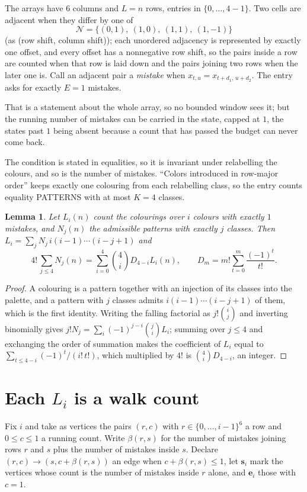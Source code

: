 \documentclass[11pt,a4paper]{article}
\theoremstyle{plain}
\newtheorem{lemma}[theorem]{Lemma}
\theoremstyle{definition}
\begin{document}
The arrays have $6$ columns and $L=n$ rows, entries in $\{0,\dots,4-1\}$.
Two cells are adjacent when they differ by one of
\[
\mathcal N=\{(0,1),\ (1,0),\ (1,1),\ (1,-1)\}
\]
(as (row shift, column shift)); each unordered adjacency is represented by exactly one
offset, and every offset has a nonnegative row shift, so the pairs inside a row are
counted when that row is laid down and the pairs joining two rows when the later one
is. Call an adjacent pair a \emph{mistake} when $x_{t,u}=x_{t+d_1,\,u+d_2}$. The entry asks for exactly
$E=1$ mistakes.

That is a statement about the whole array, so no bounded window sees it; but the running
number of mistakes can be carried in the state, capped at $1$, the states past $1$ being
absent because a count that has passed the budget can never come back.

The condition is stated in equalities, so it is invariant under relabelling the colours, and
so is the number of mistakes. ``Colors introduced in row-major order'' keeps exactly one
colouring from each relabelling class, so the entry counts equality PATTERNS with at most
$K=4$ classes.

\begin{lemma}\label{lem:inv}
Let $L_i(n)$ count the colourings over $i$ colours with exactly $1$ mistakes, and $N_j(n)$
the admissible patterns with exactly $j$ classes. Then
$L_i=\sum_j N_j\,i(i-1)\cdots(i-j+1)$ and
\[
4!\,\sum_{j\le4}N_j(n)=\sum_{i=0}^{4}\binom{4}{i}D_{4-i}L_i(n),
\qquad D_m=m!\sum_{t=0}^{m}\frac{(-1)^t}{t!} .
\]
\end{lemma}

\begin{proof}
A colouring is a pattern together with an injection of its classes into the palette, and a
pattern with $j$ classes admits $i(i-1)\cdots(i-j+1)$ of them, which is the first identity.
Writing the falling factorial as $j!\binom{i}{j}$ and inverting binomially gives
$j!N_j=\sum_i(-1)^{j-i}\binom{j}{i}L_i$; summing over $j\le4$ and exchanging the order
of summation makes the coefficient of $L_i$ equal to $\sum_{t\le4-i}(-1)^t/(i!\,t!)$,
which multiplied by $4!$ is $\binom{4}{i}D_{4-i}$, an integer.
\end{proof}

\section{Each $L_i$ is a walk count}

Fix $i$ and take as vertices the pairs $(r,c)$ with $r\in\{0,\dots,i-1\}^{6}$ a row
and $0\le c\le1$ a running count. Write $\beta(r,s)$ for the number of mistakes joining
rows $r$ and $s$ plus the number of mistakes inside $s$. Declare $(r,c)\to(s,c+\beta(r,s))$
an edge when $c+\beta(r,s)\le1$, let $\mathbf{s}_i$ mark the vertices whose count is the
number of mistakes inside $r$ alone, and $\mathbf{e}_i$ those with $c=1$.
\end{document}
